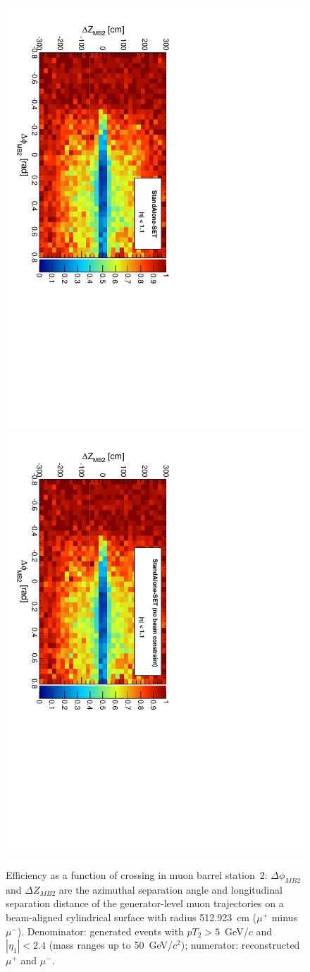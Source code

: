 \documentclass[12pt]{article}
\begin{document}
\begin{figure}[p]
\includegraphics[height=0.5\linewidth, angle=90]{fig/acceptance7_plot/mb2_StandAloneUpdatedSET.pdf}
\includegraphics[height=0.5\linewidth, angle=90]{fig/acceptance7_plot/mb2_StandAloneSET.pdf}

\caption{Efficiency as a function of crossing in muon barrel
  station~2: $\Delta\phi_{MB2}$ and $\Delta Z_{MB2}$ are the azimuthal
  separation angle and longitudinal separation distance of the
  generator-level muon trajectories on a beam-aligned cylindrical
  surface with radius 512.923~cm ($\mu^+$ minus $\mu^-$).
  Denominator: generated events with $pT_2 > 5$~GeV/$c$ and $|\eta_1|
  < 2.4$ (mass ranges up to 50~GeV/$c^2$); numerator: reconstructed
  $\mu^+$ and $\mu^-$. \label{fig:mb2}}
\end{figure}
\end{document}

